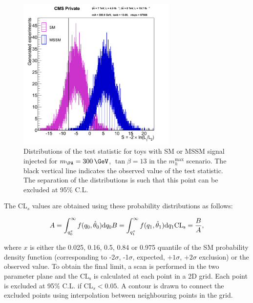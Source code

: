 \begin{figure}[tbh]
\includegraphics[width=0.7\textwidth]{plots/htt-mssm/sigsep_13.png}
\caption[Distributions of the test statistic for toys with SM or MSSM
signal injected for $m_{\PA} = 300\,\GeV$, $\tan\beta = 13$ in the $m_{h}^{\text{max}}$
scenario.]{Distributions of the test statistic for toys with \ac{SM} or
\ac{MSSM} signal injected for $m_{\PA} = 300\,\GeV$, $\tan\beta = 13$ in the $m_{h}^{\text{max}}$
scenario. The black vertical line indicates the observed value of the test
statistic. The separation of the distributions is such that this point can be
excluded at 95$\%$ C.L.}
\label{fig:toydistribution}
\end{figure}

The CL$_{s}$ values are obtained using these probability distributions as
follows:

\begin{equation}
A = \int_{q_{0}^{x}}^{\infty}f(q_{0},\hat{\theta}_{0})\mathrm{d}q_{0}\, \\
B = \int_{q_{1}^{x}}^{\infty}f(q_{1},\hat{\theta}_{1})\mathrm{d}q_{1}\, \\
\mathrm{CL_{s}} = \frac{B}{A},
\end{equation}

where $x$ is either the 0.025, 0.16, 0.5, 0.84 or 0.975 quantile of the SM
probability density function (corresponding to -2$\sigma$, -1$\sigma$, expected,
$+1\sigma$, $+2\sigma$ exclusion) or the observed value. To obtain the final limit, 
a scan is performed in the two parameter plane and
the $\mathrm{CL_{s}}$ is calculated at each point in a 2D grid. Each point is excluded at
95$\%$ C.L. if CL$_{s}<0.05$. A contour is drawn to connect the excluded points
using interpolation between neighbouring points in the grid.

